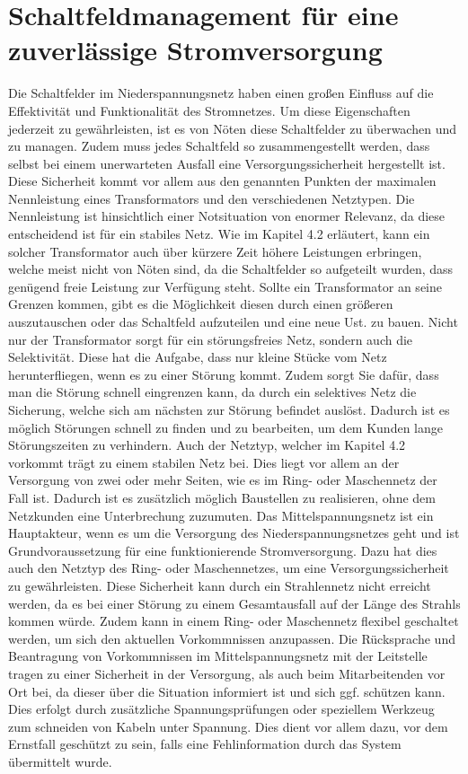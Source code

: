 \section {Schaltfeldmanagement für eine zuverlässige Stromversorgung}

Die Schaltfelder im Niederspannungsnetz haben einen großen Einfluss auf die Effektivität und Funktionalität des Stromnetzes. Um diese Eigenschaften jederzeit 
zu gewährleisten, ist es von Nöten diese Schaltfelder zu überwachen und zu managen. Zudem muss jedes Schaltfeld so zusammengestellt werden, dass selbst bei 
einem unerwarteten Ausfall eine Versorgungssicherheit hergestellt ist. Diese Sicherheit kommt vor allem aus den genannten Punkten der maximalen Nennleistung 
eines Transformators und den verschiedenen Netztypen. Die Nennleistung ist hinsichtlich einer Notsituation von enormer Relevanz, da diese entscheidend ist für ein 
stabiles Netz. Wie im Kapitel 4.2 erläutert, kann ein solcher Transformator auch über kürzere Zeit höhere Leistungen erbringen, welche meist nicht von Nöten sind, 
da die Schaltfelder so aufgeteilt wurden, dass genügend freie Leistung zur Verfügung steht. Sollte ein Transformator an seine Grenzen kommen, gibt es die Möglichkeit 
diesen durch einen größeren auszutauschen oder das Schaltfeld aufzuteilen und eine neue Ust. zu bauen. Nicht nur der Transformator sorgt für ein störungsfreies Netz, 
sondern auch die Selektivität. Diese hat die Aufgabe, dass nur kleine Stücke vom Netz herunterfliegen, wenn es zu einer Störung kommt. Zudem sorgt Sie dafür, 
dass man die Störung schnell eingrenzen kann, da durch ein selektives Netz die Sicherung, welche sich am nächsten zur Störung befindet auslöst. Dadurch ist
es möglich Störungen schnell zu finden und zu bearbeiten, um dem Kunden lange Störungszeiten zu verhindern. Auch der Netztyp, welcher im Kapitel 4.2 
vorkommt trägt zu einem stabilen Netz bei. Dies liegt vor allem an der Versorgung von zwei oder mehr Seiten, wie es im Ring- oder Maschennetz der Fall 
ist. Dadurch ist es zusätzlich möglich Baustellen zu realisieren, ohne dem Netzkunden eine Unterbrechung zuzumuten. Das Mittelspannungsnetz ist ein 
Hauptakteur, wenn es um die Versorgung des Niederspannungsnetzes geht und ist Grundvoraussetzung für eine funktionierende Stromversorgung. Dazu hat dies 
auch den Netztyp des Ring- oder Maschennetzes, um eine Versorgungssicherheit zu gewährleisten. Diese Sicherheit kann durch ein Strahlennetz nicht erreicht
werden, da es bei einer Störung zu einem Gesamtausfall auf der Länge des Strahls kommen würde. Zudem kann in einem Ring- oder Maschennetz flexibel 
geschaltet werden, um sich den aktuellen Vorkommnissen anzupassen. Die Rücksprache und Beantragung von Vorkommnissen im Mittelspannungsnetz mit der 
Leitstelle tragen zu einer Sicherheit in der Versorgung, als auch beim Mitarbeitenden vor Ort bei, da dieser über die Situation informiert ist und sich
ggf. schützen kann. Dies erfolgt \zB durch zusätzliche Spannungsprüfungen oder speziellem Werkzeug zum schneiden von Kabeln unter Spannung. Dies dient 
vor allem dazu, vor dem Ernstfall geschützt zu sein, falls eine Fehlinformation durch das System übermittelt wurde.  

\clearpage

\fi